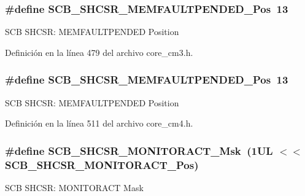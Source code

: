 \subsubsection[{\texorpdfstring{S\+C\+B\+\_\+\+S\+H\+C\+S\+R\+\_\+\+M\+E\+M\+F\+A\+U\+L\+T\+P\+E\+N\+D\+E\+D\+\_\+\+Pos}{SCB_SHCSR_MEMFAULTPENDED_Pos}}]{\setlength{\rightskip}{0pt plus 5cm}\#define S\+C\+B\+\_\+\+S\+H\+C\+S\+R\+\_\+\+M\+E\+M\+F\+A\+U\+L\+T\+P\+E\+N\+D\+E\+D\+\_\+\+Pos~13}\hypertarget{group___c_m_s_i_s___s_c_b_gaceb60fe2d8a8cb17fcd1c1f6b5aa924f}{}\label{group___c_m_s_i_s___s_c_b_gaceb60fe2d8a8cb17fcd1c1f6b5aa924f}
S\+CB S\+H\+C\+SR\+: M\+E\+M\+F\+A\+U\+L\+T\+P\+E\+N\+D\+ED Position 

Definición en la línea 479 del archivo core\+\_\+cm3.\+h.

\subsubsection[{\texorpdfstring{S\+C\+B\+\_\+\+S\+H\+C\+S\+R\+\_\+\+M\+E\+M\+F\+A\+U\+L\+T\+P\+E\+N\+D\+E\+D\+\_\+\+Pos}{SCB_SHCSR_MEMFAULTPENDED_Pos}}]{\setlength{\rightskip}{0pt plus 5cm}\#define S\+C\+B\+\_\+\+S\+H\+C\+S\+R\+\_\+\+M\+E\+M\+F\+A\+U\+L\+T\+P\+E\+N\+D\+E\+D\+\_\+\+Pos~13}\hypertarget{group___c_m_s_i_s___s_c_b_gaceb60fe2d8a8cb17fcd1c1f6b5aa924f}{}\label{group___c_m_s_i_s___s_c_b_gaceb60fe2d8a8cb17fcd1c1f6b5aa924f}
S\+CB S\+H\+C\+SR\+: M\+E\+M\+F\+A\+U\+L\+T\+P\+E\+N\+D\+ED Position 

Definición en la línea 511 del archivo core\+\_\+cm4.\+h.

\subsubsection[{\texorpdfstring{S\+C\+B\+\_\+\+S\+H\+C\+S\+R\+\_\+\+M\+O\+N\+I\+T\+O\+R\+A\+C\+T\+\_\+\+Msk}{SCB_SHCSR_MONITORACT_Msk}}]{\setlength{\rightskip}{0pt plus 5cm}\#define S\+C\+B\+\_\+\+S\+H\+C\+S\+R\+\_\+\+M\+O\+N\+I\+T\+O\+R\+A\+C\+T\+\_\+\+Msk~(1\+U\+L $<$$<$ S\+C\+B\+\_\+\+S\+H\+C\+S\+R\+\_\+\+M\+O\+N\+I\+T\+O\+R\+A\+C\+T\+\_\+\+Pos)}\hypertarget{group___c_m_s_i_s___s_c_b_gaad09b4bc36e9bccccc2e110d20b16e1a}{}\label{group___c_m_s_i_s___s_c_b_gaad09b4bc36e9bccccc2e110d20b16e1a}
S\+CB S\+H\+C\+SR\+: M\+O\+N\+I\+T\+O\+R\+A\+CT Mask 

